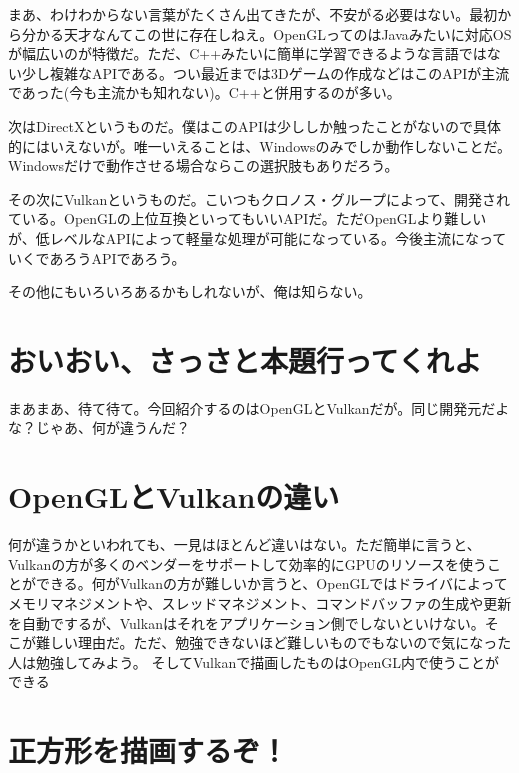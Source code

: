 \documentclass[12pt,a4paper]{jsarticle}
\begin{document}
まあ、わけわからない言葉がたくさん出てきたが、不安がる必要はない。最初から分かる天才なんてこの世に存在しねえ。OpenGLってのはJavaみたいに対応OSが幅広いのが特徴だ。ただ、C++みたいに簡単に学習できるような言語ではない少し複雑なAPIである。つい最近までは3Dゲームの作成などはこのAPIが主流であった(今も主流かも知れない)。C++と併用するのが多い。

次はDirectXというものだ。僕はこのAPIは少ししか触ったことがないので具体的にはいえないが。唯一いえることは、Windowsのみでしか動作しないことだ。Windowsだけで動作させる場合ならこの選択肢もありだろう。

その次にVulkanというものだ。こいつもクロノス・グループによって、開発されている。OpenGLの上位互換といってもいいAPIだ。ただOpenGLより難しいが、低レベルなAPIによって軽量な処理が可能になっている。今後主流になっていくであろうAPIであろう。

その他にもいろいろあるかもしれないが、俺は知らない。


\section{おいおい、さっさと本題行ってくれよ}
 まあまあ、待て待て。今回紹介するのはOpenGLとVulkanだが。同じ開発元だよな？じゃあ、何が違うんだ？

\section{OpenGLとVulkanの違い}
 何が違うかといわれても、一見はほとんど違いはない。ただ簡単に言うと、Vulkanの方が多くのベンダーをサポートして効率的にGPUのリソースを使うことができる。何がVulkanの方が難しいか言うと、OpenGLではドライバによってメモリマネジメントや、スレッドマネジメント、コマンドバッファの生成や更新を自動でするが、Vulkanはそれをアプリケーション側でしないといけない。そこが難しい理由だ。ただ、勉強できないほど難しいものでもないので気になった人は勉強してみよう。
 そしてVulkanで描画したものはOpenGL内で使うことができる

\section{正方形を描画するぞ！}
\end{document}
